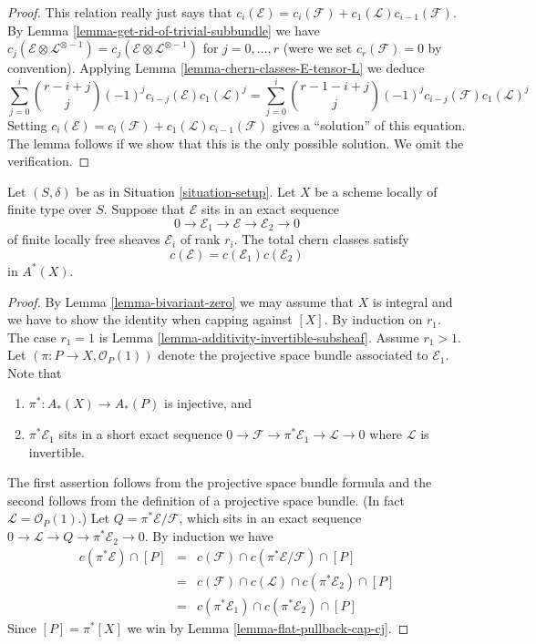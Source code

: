 \begin{proof}
This relation really just says that
$c_i(\mathcal{E}) = c_i(\mathcal{F}) + c_1(\mathcal{L})c_{i - 1}(\mathcal{F})$.
By Lemma \ref{lemma-get-rid-of-trivial-subbundle}
we have $c_j(\mathcal{E} \otimes \mathcal{L}^{\otimes -1})
= c_j(\mathcal{E} \otimes \mathcal{L}^{\otimes -1})$ for
$j = 0, \ldots, r$ (were we set $c_r(\mathcal{F}) = 0$ by
convention).
Applying Lemma \ref{lemma-chern-classes-E-tensor-L} we deduce
$$
\sum_{j = 0}^i
\binom{r - i + j}{j} (-1)^j c_{i - j}({\mathcal E}) c_1({\mathcal L})^j
=
\sum_{j = 0}^i
\binom{r - 1 - i + j}{j} (-1)^j c_{i - j}({\mathcal F}) c_1({\mathcal L})^j
$$
Setting
$c_i(\mathcal{E}) = c_i(\mathcal{F}) + c_1(\mathcal{L})c_{i - 1}(\mathcal{F})$
gives a ``solution'' of this equation. The lemma follows if we show
that this is the only possible solution. We omit the verification.
\end{proof}

\begin{lemma}
\label{lemma-additivity-chern-classes}
Let $(S, \delta)$ be as in Situation \ref{situation-setup}.
Let $X$ be a scheme locally of finite type over $S$.
Suppose that ${\mathcal E}$ sits in an
exact sequence
$$
0
\to
{\mathcal E}_1
\to
{\mathcal E}
\to
{\mathcal E}_2
\to
0
$$
of finite locally free sheaves $\mathcal{E}_i$ of rank $r_i$.
The total chern classes satisfy
$$
c({\mathcal E}) = c({\mathcal E}_1) c({\mathcal E}_2)
$$
in $A^*(X)$.
\end{lemma}

\begin{proof}
By Lemma \ref{lemma-bivariant-zero} we may assume that $X$ is integral
and we have to show the identity when capping against $[X]$.
By induction on $r_1$. The case $r_1 = 1$ is
Lemma \ref{lemma-additivity-invertible-subsheaf}.
Assume $r_1 > 1$. Let $(\pi : P \to X, \mathcal{O}_P(1))$
denote the projective space bundle associated to $\mathcal{E}_1$. Note that
\begin{enumerate}
\item $\pi^* : A_*(X) \to A_*(P)$ is injective, and
\item $\pi^*\mathcal{E}_1$ sits in a short exact sequence
$0 \to \mathcal{F} \to \pi^*\mathcal{E}_1 \to \mathcal{L} \to 0$
where $\mathcal{L}$ is invertible.
\end{enumerate}
The first assertion follows from the projective space bundle formula
and the second follows from the definition of a projective space bundle.
(In fact $\mathcal{L} = \mathcal{O}_P(1)$.)
Let $Q = \pi^*\mathcal{E}/\mathcal{F}$, which sits in an
exact sequence $0 \to \mathcal{L} \to Q \to \pi^*\mathcal{E}_2 \to 0$.
By induction we have
\begin{eqnarray*}
c(\pi^*\mathcal{E}) \cap [P]
& = &
c(\mathcal{F}) \cap c(\pi^*\mathcal{E}/\mathcal{F}) \cap [P] \\
& = &
c(\mathcal{F}) \cap c(\mathcal{L}) \cap c(\pi^*\mathcal{E}_2) \cap [P] \\
& = &
c(\pi^*\mathcal{E}_1) \cap c(\pi^*\mathcal{E}_2) \cap [P]
\end{eqnarray*}
Since $[P] = \pi^*[X]$ we
win by Lemma \ref{lemma-flat-pullback-cap-cj}.
\end{proof}

